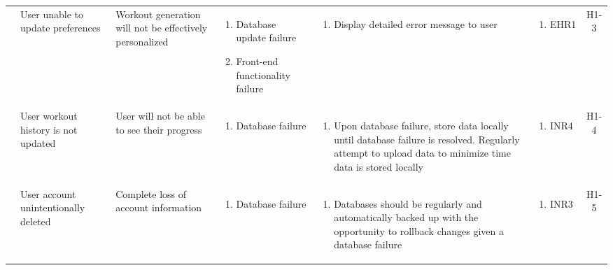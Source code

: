 \documentclass{article}
\begin{document}
\begin{longtable}{|p{1.7cm}|p{1.7cm} p{2.4cm} p{2.4cm} p{3.5cm} p{1.6cm} c|}
  & User unable to update preferences & Workout generation will not be effectively personalized & \vspace*{-\baselineskip}\begin{enumerate}[label=\alph*., left=0pt, nosep]\item Database update failure \item Front-end functionality failure \end{enumerate} & \vspace*{-\baselineskip}\begin{enumerate}[label=\alph*., left=0pt, nosep]\item Display detailed error message to user \end{enumerate} & \vspace*{-\baselineskip}\begin{enumerate}[label=\alph*., left=0pt, nosep] \item EHR1 \end{enumerate} & H1-3\\
  \cline{2-7}
  & User workout history is not updated & User will not be able to see their progress & \vspace*{-\baselineskip}\begin{enumerate}[label=\alph*., left=0pt, nosep]\item Database failure \end{enumerate} & \vspace*{-\baselineskip}\begin{enumerate}[label=\alph*., left=0pt, nosep]\item Upon database failure, store data locally until database failure is resolved. Regularly attempt to upload data to minimize time data is stored locally \end{enumerate} & \vspace*{-\baselineskip}\begin{enumerate}[label=\alph*., left=0pt, nosep] \item INR4 \end{enumerate} & H1-4\\
  \cline{2-7}
  & User account unintentionally deleted & Complete loss of account information & \vspace*{-\baselineskip}\begin{enumerate}[label=\alph*., left=0pt, nosep]\item Database failure \end{enumerate} & \vspace*{-\baselineskip}\begin{enumerate}[label=\alph*., left=0pt, nosep]\item Databases should be regularly and automatically backed up with the opportunity to rollback changes given a database failure \end{enumerate}& \vspace*{-\baselineskip}\begin{enumerate}[label=\alph*., left=0pt, nosep] \item INR3 \end{enumerate} & H1-5\\

\end{longtable}
\end{document}

